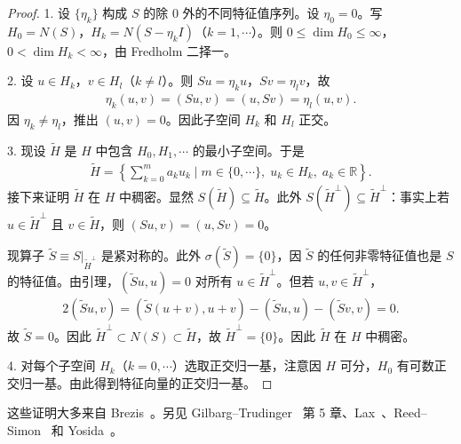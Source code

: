 \documentclass[../main.tex]{subfiles}
\begin{document}
\begin{proof}
1. 设 $\{\eta_k\}$ 构成 $S$ 的除 $0$ 外的不同特征值序列。设 $\eta_0=0$。写 $H_0=N(S)$，$H_k=N(S-\eta_kI)$（$k=1,\cdots$）。则 $0\leqslant\dim H_0\leqslant\infty$，$0<\dim H_k<\infty$，由 Fredholm 二择一。

2. 设 $u\in H_k$，$v\in H_l$（$k\neq l$）。则 $Su=\eta_ku$，$Sv=\eta_lv$，故
\begin{align*}
\eta_k(u,v)=(Su,v)=(u,Sv)=\eta_l(u,v).
\end{align*}
因 $\eta_k\neq\eta_l$，推出 $(u,v)=0$。因此子空间 $H_k$ 和 $H_l$ 正交。

3. 现设 $\widetilde{H}$ 是 $H$ 中包含 $H_0,H_1,\cdots$ 的最小子空间。于是
\begin{align*}
\widetilde{H}=\left\{\sum_{k=0}^m a_ku_k\mid m\in\{0,\cdots\},\;u_k\in H_k,\;a_k\in\mathbb{R}\right\}.
\end{align*}
接下来证明 $\widetilde{H}$ 在 $H$ 中稠密。显然 $S(\widetilde{H})\subseteq\widetilde{H}$。此外 $S(\widetilde{H}^\perp)\subseteq\widetilde{H}^\perp$：事实上若 $u\in\widetilde{H}^\perp$ 且 $v\in\widetilde{H}$，则 $(Su,v)=(u,Sv)=0$。

现算子 $\widetilde{S}\equiv S|_{\widetilde{H}^\perp}$ 是紧对称的。此外 $\sigma(\widetilde{S})=\{0\}$，因 $\widetilde{S}$ 的任何非零特征值也是 $S$ 的特征值。由引理，$(\widetilde{S}u,u)=0$ 对所有 $u\in\widetilde{H}^\perp$。但若 $u,v\in\widetilde{H}^\perp$，
\begin{align*}
2(\widetilde{S}u,v)=(\widetilde{S}(u+v),u+v)-(\widetilde{S}u,u)-(\widetilde{S}v,v)=0.
\end{align*}
故 $\widetilde{S}=0$。因此 $\widetilde{H}^\perp\subset N(S)\subset\widetilde{H}$，故 $\widetilde{H}^\perp=\{0\}$。因此 $\widetilde{H}$ 在 $H$ 中稠密。

4. 对每个子空间 $H_k$（$k=0,\cdots$）选取正交归一基，注意因 $H$ 可分，$H_0$ 有可数正交归一基。由此得到特征向量的正交归一基。
\end{proof}

这些证明大多来自 Brezis~\cite{Br1}。另见 Gilbarg--Trudinger~\cite{G-T} 第 5 章、Lax~\cite{Lx2}、Reed--Simon~\cite{R-S1} 和 Yosida~\cite{Y}。
\end{document}
